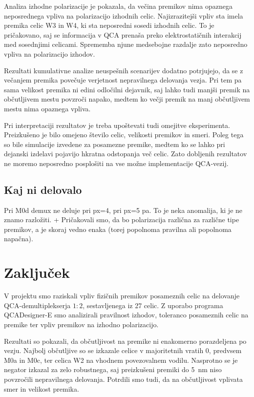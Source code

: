Analiza izhodne polarizacije je pokazala, da večina premikov nima opaznega neposrednega vpliva na polarizacijo izhodnih celic. Najizrazitejši vpliv sta imela premika celic W3 in W4, ki sta neposredni sosedi izhodnih celic. To je pričakovano, saj se informacija v QCA prenaša preko elektrostatičnih interakcij med sosednjimi celicami. Sprememba njune medsebojne razdalje zato neposredno vpliva na polarizacijo izhodov.

Rezultati kumulativne analize neuspešnih scenarijev dodatno potrjujejo, da se z večanjem premika povečuje verjetnost nepravilnega delovanja vezja. Pri tem pa sama velikost premika ni edini odločilni dejavnik, saj lahko tudi manjši premik na občutljivem mestu povzroči napako, medtem ko večji premik na manj občutljivem mestu nima opaznega vpliva.

Pri interpretaciji rezultatov je treba upoštevati tudi omejitve eksperimenta. Preizkušeno je bilo omejeno število celic, velikosti premikov in smeri. Poleg tega so bile simulacije izvedene za posamezne premike, medtem ko se lahko pri dejanski izdelavi pojavijo hkratna odstopanja več celic. Zato dobljenih rezultatov ne moremo neposredno posplošiti na vse možne implementacije QCA-vezij.



\subsection{Kaj ni delovalo}
\label{g27:sec:neuspehi}

Pri M0d demux ne deluje pri px=4, pri px=5 pa. To je neka anomalija, ki je ne znamo razložiti. 
+ Pričakovali smo, da bo polarizacija različna za različne tipe premikov, a je skoraj vedno enaka (torej popolnoma pravilna ali popolnoma napačna).

\section{Zaključek}
\label{g27:sec:zakljucek}

V projektu smo raziskali vpliv fizičnih premikov posameznih celic na delovanje QCA-demultiplekserja $1:2$, sestavljenega iz 27 celic. Z uporabo programa QCADesigner-E smo analizirali pravilnost izhodov, toleranco posameznih celic na premike ter vpliv premikov na izhodno polarizacijo.

Rezultati so pokazali, da občutljivost na premike ni enakomerno porazdeljena po vezju. Najbolj občutljive so se izkazale celice v majoritetnih vratih 0, predvsem M0a in M0c, ter celica W2 na vhodnem povezovalnem vodilu. Nasprotno se je negator izkazal za zelo robustnega, saj preizkušeni premiki do \SI{5}{\nano\metre} niso povzročili nepravilnega delovanja. Potrdili smo tudi, da na občutljivost vplivata smer in velikost premika.

